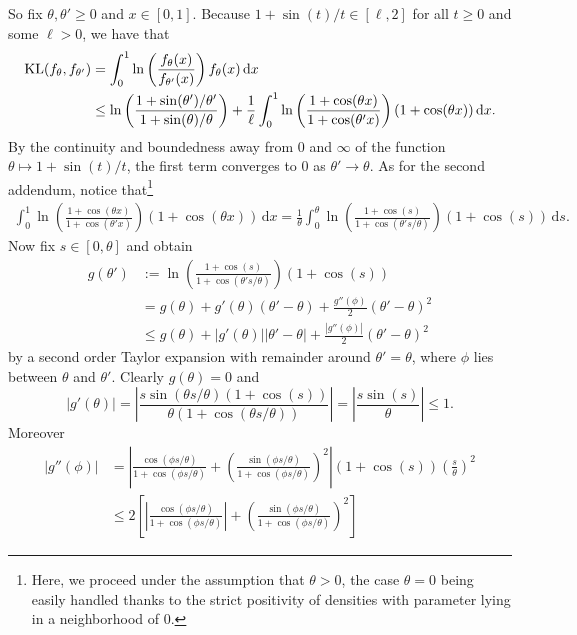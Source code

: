 \documentclass[11pt,twoside]{article}
\newcommand{\kl}{\textnormal{KL}}
\begin{document}
So fix $\theta,\theta'\geq 0$ and $x\in[0,1]$. Because $1+\sin(t)/t\in[\ell, 2]$ for all $t\geq 0$ and some $\ell>0$, we have that
%
\begin{align*}
    \kl(f_{\theta}, f_{\theta'}) & =\int_0^1\ln\left(\frac{f_\theta(x)}{f_{\theta'}(x)} \right) f_\theta(x) \,\mathrm dx \\
    & \leq \ln\left(\frac{1+\sin(\theta')/\theta'}{1+\sin(\theta)/\theta}\right) + \frac{1}{\ell}\int_0^1 \ln\left(\frac{1+\cos(\theta x)}{1+\cos(\theta' x)}\right)(1+\cos(\theta x)) \, \mathrm dx .
\end{align*}
%
By the continuity and boundedness away from $0$ and $\infty$ of the function $\theta \mapsto 1+\sin(t)/t$, the first term converges to $0$ as $\theta' \to \theta$. As for the second addendum, notice that\footnote{Here, we proceed under the assumption that $\theta>0$, the case $\theta=0$ being easily handled thanks to the strict positivity of densities with parameter lying in a neighborhood of 0.} 
%
\begin{align*}
    \int_0^1 \ln\left(\frac{1+\cos(\theta x)}{1+\cos(\theta' x)}\right)(1+\cos(\theta x)) \, \mathrm dx = \frac{1}{\theta} \int_0^\theta \ln\left(\frac{1+\cos(s)}{1+\cos(\theta's/\theta)}\right)(1+\cos(s))\,\mathrm ds.
\end{align*}
%
Now fix $s\in[0,\theta]$ and obtain
%
\begin{align*}
    g(\theta') & := \ln\left(\frac{1+\cos(s)}{1+\cos(\theta's/\theta)}\right)(1+\cos(s)) \\
    & = g(\theta) + g'(\theta)(\theta'-\theta) + \frac{g''(\phi)}{2} (\theta'-\theta)^2 \\
    & \leq g(\theta) + |g'(\theta)||\theta'-\theta| + \frac{|g''(\phi)| }{2} (\theta'-\theta)^2
\end{align*}
%
by a second order Taylor expansion with remainder around $\theta'=\theta$, where $\phi$ lies between $\theta$ and $\theta'$. Clearly $g(\theta)=0$ and
%
\begin{equation*}
    |g'(\theta)|= \left|\frac{s\sin(\theta s/\theta)(1+\cos(s))}{\theta(1+\cos(\theta s/\theta))}\right| = \left|\frac{s\sin(s)}{\theta}\right| \leq 1.
\end{equation*}
%
Moreover
%
\begin{align*}
    |g''(\phi)| & = \left|\frac{\cos(\phi s/\theta)}{1 + \cos(\phi s/\theta)} + \left(\frac{\sin(\phi s/\theta)}{1+\cos(\phi s/\theta)}\right)^2 \right| (1+\cos(s))\left(\frac{s}{\theta}\right)^2 \\
    & \leq 2\left[\left|\frac{\cos(\phi s/\theta)}{1 + \cos(\phi s/\theta)}\right| + \left(\frac{\sin(\phi s/\theta)}{1+\cos(\phi s/\theta)}\right)^2 \right]
\end{align*}
\end{document}
